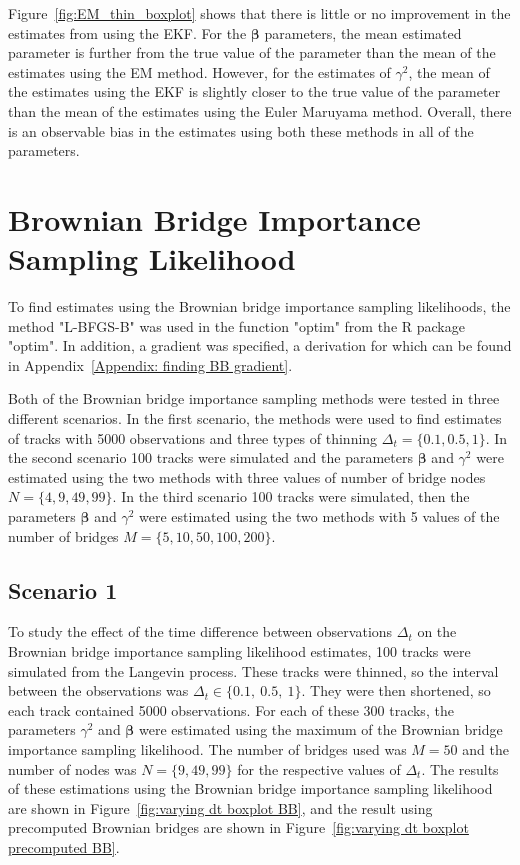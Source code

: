 Figure~\ref{fig:EM_thin_boxplot} shows that there is little or no improvement in the estimates from using the EKF. For the $\bm \beta$ parameters, the mean estimated parameter is further from the true value of the parameter than the mean of the estimates using the EM method. However, for the estimates of $\gamma^2$, the mean of the estimates using the EKF is slightly closer to the true value of the parameter than the mean of the estimates using the Euler Maruyama method. Overall, there is an observable bias in the estimates using both these methods in all of the parameters.

\section{Brownian Bridge Importance Sampling Likelihood}
\label{sec: BB test}
To find estimates using the Brownian bridge importance sampling likelihoods, the method "L-BFGS-B" was used in the function "optim" from the R package "optim". In addition, a gradient was specified, a derivation for which can be found in Appendix~\ref{Appendix: finding BB gradient}. 


Both of the Brownian bridge importance sampling methods were tested in three different scenarios. In the first scenario, the methods were used to find estimates of tracks with 5000 observations and three types of thinning $\Delta_t =\{0.1, 0.5, 1\}$. In the second scenario 100 tracks were simulated and the parameters $\bm \beta$ and $\gamma^2$ were estimated using the two methods with three values of number of bridge nodes $N=\{4, 9, 49, 99\}$. In the third scenario 100 tracks were simulated, then the parameters $\bm \beta$ and $\gamma^2$ were estimated using the two methods with 5 values of the number of bridges $M=\{5,10,50,100,200\}$. 


\subsection{Scenario 1}
To study the effect of the time difference between observations $\Delta_t$ on the Brownian bridge importance sampling likelihood estimates, 100 tracks were simulated from the Langevin process. These tracks were thinned, so the interval between the observations was $\Delta_t \in \{0.1, \ 0.5, \ 1\}$. They were then shortened, so each track contained 5000 observations. For each of these 300 tracks, the parameters $\gamma^2$ and $\bm \beta$ were estimated using the maximum of the Brownian bridge importance sampling likelihood. The number of bridges used was $M=50$ and the number of nodes was $N =\{9,49,99\}$ for the respective values of $\Delta_t$. The results of these estimations using the Brownian bridge importance sampling likelihood are shown in Figure~\ref{fig:varying dt boxplot BB}, and the result using precomputed Brownian bridges are shown in Figure~\ref{fig:varying dt boxplot precomputed BB}.

